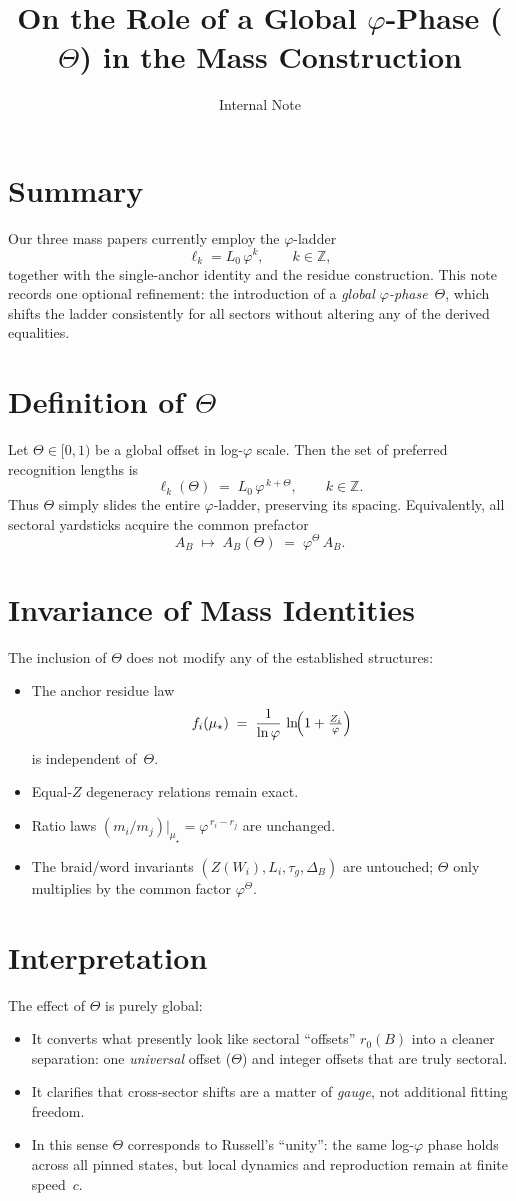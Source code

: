 \documentclass[12pt]{article}
\begin{document}
\title{On the Role of a Global $\varphi$-Phase ($\Theta$) in the Mass Construction}
\author{Internal Note}
\date{}
\maketitle
\section*{Summary}
Our three mass papers currently employ the $\varphi$-ladder
\[
  \ell_k = L_0\,\varphi^k, \qquad k\in\mathbb{Z},
\]
together with the single-anchor identity and the residue construction.  
This note records one optional refinement: the introduction of a \emph{global $\varphi$-phase}~$\Theta$, which shifts the ladder consistently for all sectors without altering any of the derived equalities.  
\section*{Definition of $\Theta$}
Let $\Theta\in[0,1)$ be a global offset in log-$\varphi$ scale. Then the set of preferred recognition lengths is
\[
  \ell_k(\Theta) \;=\; L_0\,\varphi^{\,k+\Theta}, \qquad k\in\mathbb{Z}.
\]
Thus $\Theta$ simply slides the entire $\varphi$-ladder, preserving its spacing.  
Equivalently, all sectoral yardsticks acquire the common prefactor
\[
  A_B \;\mapsto\; A_B(\Theta) \;=\; \varphi^{\Theta}\,A_B.
\]
\section*{Invariance of Mass Identities}
The inclusion of $\Theta$ does not modify any of the established structures:
\begin{itemize}
  \item The anchor residue law
  \[
    f_i(\mu_\star) \;=\; \frac{1}{\ln\varphi}\,\ln\!\Bigl(1+\tfrac{Z_i}{\varphi}\Bigr)
  \]
  is independent of~$\Theta$.
  \item Equal-$Z$ degeneracy relations remain exact.
  \item Ratio laws $(m_i/m_j)|_{\mu_\star}=\varphi^{\,r_i-r_j}$ are unchanged.
  \item The braid/word invariants $(Z(W_i), L_i,\tau_g,\Delta_B)$ are untouched; $\Theta$ only multiplies by the common factor $\varphi^{\Theta}$.
\end{itemize}
\section*{Interpretation}
The effect of $\Theta$ is purely global:
\begin{itemize}
  \item It converts what presently look like sectoral ``offsets'' $r_0(B)$ into a cleaner separation: one \emph{universal} offset ($\Theta$) and integer offsets that are truly sectoral.
  \item It clarifies that cross-sector shifts are a matter of \emph{gauge}, not additional fitting freedom.
  \item In this sense $\Theta$ corresponds to Russell's ``unity'': the same log-$\varphi$ phase holds across all pinned states, but local dynamics and reproduction remain at finite speed~$c$.
\end{itemize}
\end{document}

